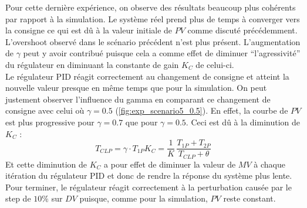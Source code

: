 Pour cette dernière expérience, on observe des résultats beaucoup plus cohérents par rapport à la simulation. Le système réel prend plus de temps à converger
vers la consigne ce qui est dû à la valeur initiale de $PV$ comme discuté précédemment. L'overshoot observé dans le scénario précédent n'est plus présent.
L'augmentation de $\gamma$ peut y avoir contribué puisque cela a comme effet de diminuer ``l'agressivité'' du régulateur en diminuant la constante de gain $K_C$ de celui-ci.
\\Le régulateur PID réagit correctement au changement de consigne et atteint la nouvelle valeur presque en même temps que pour la simulation. 
On peut justement observer l'influence du gamma en comparant ce changement de consigne avec celui où $\gamma = 0.5$ (\ref{fig:exp_scenario5_0.5}). En effet,
la courbe de $PV$ est plus progressive pour $\gamma = 0.7$ que pour $\gamma = 0.5$. Ceci est dû à la diminution de $K_C$ : 
\begin{equation}
	T_{CLP} = \gamma\cdot T_{1P}
	K_C = \frac{1}{K}\,\frac{T_{1P}+T_{2P}}{T_{CLP}+\theta}
\end{equation}
Et cette diminution de $K_C$ a pour effet de diminuer la valeur de $MV$ à chaque itération du régulateur PID et donc de rendre la réponse du système plus lente.
Pour terminer, le régulateur réagit correctement à la perturbation causée par le step de $10\%$ sur $DV$ puisque, comme pour la simulation, $PV$ reste constant.
